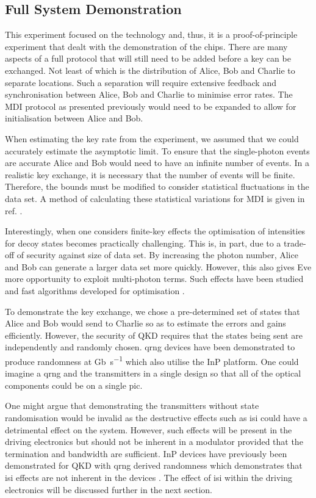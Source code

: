 \subsection{Full System Demonstration}

This experiment focused on the technology and, thus, it is a proof-of-principle experiment that dealt with the demonstration of the chips. There are many aspects of a full protocol that will still need to be added before a key can be exchanged. Not least of which is the distribution of Alice, Bob and Charlie to separate locations. Such a separation will require extensive feedback and synchronisation between Alice, Bob and Charlie to minimise error rates. The \ac{MDI} protocol as presented previously would need to be expanded to allow for initialisation between Alice and Bob. 

When estimating the key rate from the experiment, we assumed that we could accurately estimate the asymptotic limit. To ensure that the single-photon events are accurate Alice and Bob would need to have an infinite number of events. In a realistic key exchange, it is necessary that the number of events will be finite. Therefore, the bounds must be modified to consider statistical fluctuations in the data set. A method of calculating these statistical variations for \ac{MDI} is given in ref. \cite{zhou2016}.

Interestingly, when one considers finite-key effects the optimisation of intensities for decoy states becomes practically challenging. This is, in part, due to a trade-off of security against size of data set. By increasing the photon number, Alice and Bob can generate a larger data set more quickly. However, this also gives Eve more opportunity to exploit multi-photon terms. Such effects have been studied and fast algorithms developed for optimisation \cite{Wang2019asymmetric}.

To demonstrate the key exchange, we chose a pre-determined set of states that Alice and Bob would send to Charlie so as to estimate the errors and gains efficiently. However, the security of \ac{QKD} requires that the states being sent are independently and randomly chosen. \Ac{qrng} devices have been demonstrated to produce randomness at \si{Gb\per\second} \cite{raffaelli2018generation, Abellan2016, Herrero-Collantes2017Quantum} which also utilise the \ac{InP} platform. One could imagine a \ac{qrng} and the transmitters in a single design so that all of the optical components could be on a single \ac{pic}.

One might argue that demonstrating the transmitters without state randomisation would be invalid as the destructive effects such as \ac{isi} could have a detrimental effect on the system. However, such effects will be present in the driving electronics but should not be inherent in a modulator provided that the termination and bandwidth are sufficient. \Ac{InP} devices have previously been demonstrated for \ac{QKD} with \ac{qrng} derived randomness which demonstrates that \ac{isi} effects are not inherent in the devices \cite{Sibson2017InP}. The effect of \ac{isi} within the driving electronics will be discussed further in the next section.

